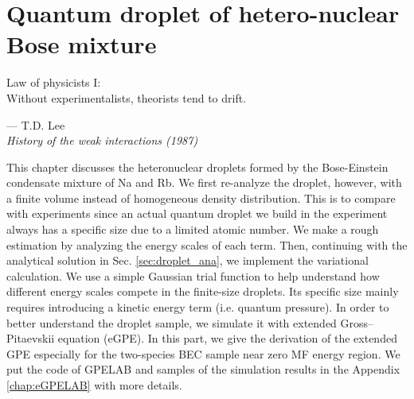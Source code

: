 \chapter{Quantum droplet of hetero-nuclear Bose mixture}
\label{Chap_droplet}

\setlength{\unitlength}{1pt}
\setlength{\epigraphwidth}{10cm}
\epigraph{Law of physicists I: \\ Without experimentalists, theorists tend to drift. \cite{Lee:1992ui}}{--- T.D. Lee\\ \textit{History of the weak interactions (1987)}}


This chapter discusses the heteronuclear droplets formed by the Bose-Einstein condensate mixture of Na and Rb. We first re-analyze the droplet, however, with a finite volume instead of homogeneous density distribution. This is to compare with experiments since an actual quantum droplet we build in the experiment always has a specific size due to a limited atomic number. We make a rough estimation by analyzing the energy scales of each term. Then, continuing with the analytical solution in Sec. \ref{sec:droplet_ana}, we implement the variational calculation. We use a simple Gaussian trial function to help understand how different energy scales compete in the finite-size droplets. Its specific size mainly requires introducing a kinetic energy term (i.e. quantum pressure). In order to better understand the droplet sample, we simulate it with extended Gross–Pitaevskii equation (eGPE). In this part, we give the derivation of the extended GPE especially for the two-species BEC sample near zero MF energy region. We put the code of GPELAB \cite{ANTOINE20142969} and samples of the simulation results in the Appendix \ref{chap:eGPELAB} with more details.

